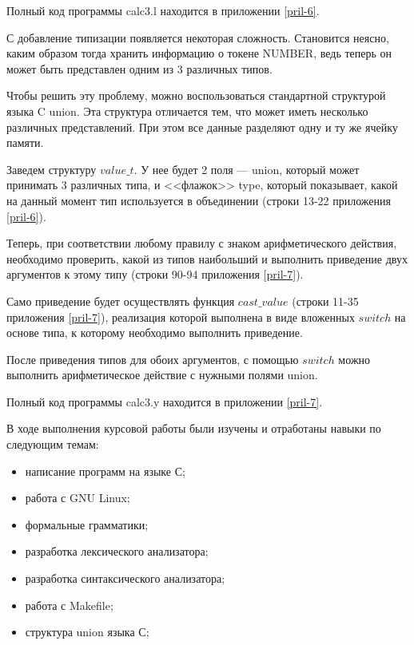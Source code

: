 \documentclass[bachelor, och, coursework, times]{SCWorks}
\begin{document}
Полный код программы calc3.l находится в приложении \ref{pril-6}.

С добавление типизации появляется некоторая сложность. Становится неясно, каким образом тогда хранить информацию о токене NUMBER, ведь теперь он может быть представлен одним из 3 различных типов.

Чтобы решить эту проблему, можно воспользоваться стандартной структурой языка C union. Эта структура отличается тем, что может иметь несколько различных представлений. При этом все данные разделяют одну и ту же ячейку памяти. ~\cite{kernigan}

Заведем структуру $value\_t$. У нее будет 2 поля --- union, который может принимать 3 различных типа, и <<флажок>> type, который показывает, какой на данный момент тип используется в объединении (строки 13-22 приложения \ref{pril-6}).

Теперь, при соответствии любому правилу с знаком арифметического действия, необходимо проверить, какой из типов наибольший и выполнить приведение двух аргументов к этому типу (строки 90-94 приложения \ref{pril-7}).

Само приведение будет осуществлять функция $cast\_value$ (строки 11-35 приложения \ref{pril-7}), реализация которой выполнена в виде вложенных $switch$ на основе типа, к которому необходимо выполнить приведение.

После приведения типов для обоих аргументов, с помощью $switch$ можно выполнить арифметическое действие с нужными полями union.

Полный код программы calc3.y находится в приложении \ref{pril-7}.






\conclusion
В ходе выполнения курсовой работы были изучены и отработаны навыки по следующим темам:
\begin{itemize}
	\item написание программ на языке С;
	\item работа с GNU Linux;
	\item формальные грамматики;
	\item разработка лексического анализатора;
	\item разработка синтаксического анализатора;
	\item работа с Makefile;
	\item структура union языка С;
\end{itemize}


%
\end{document}
